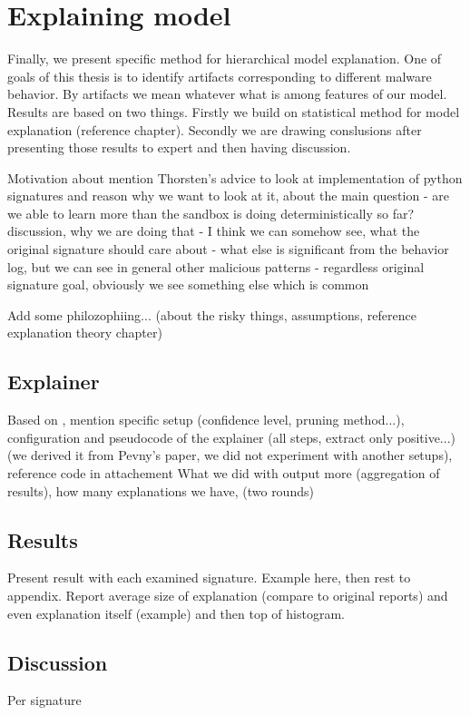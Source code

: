 \chapter{Explaining model}
Finally, we present specific method for hierarchical model explanation. One of goals of this thesis is to identify artifacts corresponding to different malware behavior. By artifacts we mean whatever what is among features of our model. Results are based on two things. Firstly we build on statistical method for model explanation (reference chapter). Secondly we are drawing conslusions after presenting those results to expert and then having discussion.

Motivation about mention Thorsten's advice to look at implementation of python signatures and reason why we want to look at it, about the main question - are we able to learn more than the sandbox is doing deterministically so far?
discussion, why we are doing that - I think we can somehow see, what the original signature should care about - what else is significant from the behavior log, but we can see in general other malicious patterns - regardless original signature goal, obviously we see something else which is common

Add some philozophiing... (about the risky things, assumptions, reference explanation theory chapter)

\section{Explainer}
Based on , mention specific setup (confidence level, pruning method...), configuration and pseudocode of the explainer (all steps, extract only positive...) (we derived it from Pevny's paper, we did not experiment with another setups), reference code in attachement
What we did with output more (aggregation of results), how many explanations we have, (two rounds)
\section{Results}
Present result with each examined signature. Example here, then rest to appendix. Report average size of explanation (compare to original reports) and even explanation itself (example) and then top of histogram.

\section{Discussion}
Per signature

